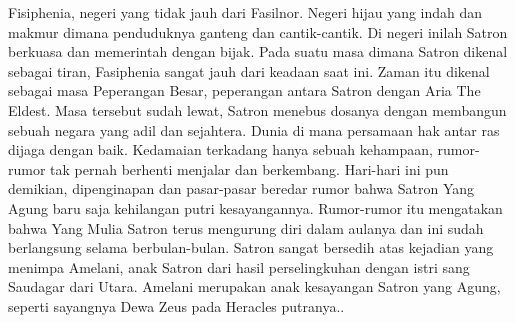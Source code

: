 %
%
% 
%

Fisiphenia, negeri yang tidak jauh dari Fasilnor. 
Negeri hijau yang indah dan makmur dimana penduduknya ganteng dan cantik-cantik. 
Di negeri inilah Satron berkuasa dan memerintah dengan bijak.
Pada suatu masa dimana Satron dikenal sebagai tiran, Fasiphenia sangat jauh 
dari keadaan saat ini. 
Zaman itu dikenal sebagai masa Peperangan Besar, peperangan antara Satron 
dengan Aria The Eldest. 
Masa tersebut sudah lewat, Satron menebus dosanya dengan membangun sebuah 
negara yang adil dan sejahtera. 
Dunia di mana persamaan hak antar ras dijaga dengan baik. 
Kedamaian terkadang hanya sebuah kehampaan, rumor-rumor tak pernah berhenti 
menjalar dan berkembang. 
Hari-hari ini pun demikian, dipenginapan dan pasar-pasar beredar rumor bahwa 
Satron Yang Agung baru saja kehilangan putri kesayangannya. 
Rumor-rumor itu mengatakan bahwa Yang Mulia Satron terus mengurung diri 
dalam aulanya dan ini sudah berlangsung selama berbulan-bulan.
Satron sangat bersedih atas kejadian yang menimpa Amelani, anak Satron dari 
hasil perselingkuhan dengan istri sang Saudagar dari Utara. 
Amelani merupakan anak kesayangan Satron yang Agung, seperti sayangnya 
Dewa Zeus pada Heracles putranya..

